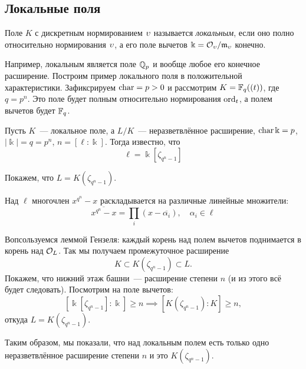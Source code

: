 	 \subsection{Локальные поля}

	 \begin{definition} 
	 	Поле $K$ с дискретным нормированием $\upsilon$ называется \emph{локальным}, если оно полно относительно нормирования $\upsilon$, а его поле вычетов $\Bbbk = \mathcal{O}_{\upsilon}/\mathfrak{m}_{\upsilon}$  конечно. 
	 \end{definition}

	 \begin{example}
	 	Например, локальным является поле $\mathbb{Q}_{p}$ и вообще любое его конечное расширение. Построим пример локального поля в положительной характеристики. Зафиксрируем $\operatorname{char} = p > 0$ и рассмотрим $K = \mathbb{F}_{q}((t))$, где $q = p^n$. Это поле будет полным относительно нормирования $\operatorname{ord}_{t}$, а полем вычетов будет $\mathbb{F}_{q}$.
	 \end{example}

	 Пусть $K$~--- локальное поле, а $L/K$~--- неразветвлённое расширение, $\operatorname{char}{\Bbbk} = p$, $|\Bbbk| = q = p^n$, $n = [\ell : \Bbbk]$. Тогда известно, что 
	 \[
	 	\ell = \Bbbk[\zeta_{q^n - 1}]
	 \]

	 Покажем, что $L = K(\zeta_{q^n - 1})$. 

	 Над $\ell$ многочлен $x^{q^n} - x$ раскладывается на различные линейные множители:
	 \[
	 	\overline{x^{q^n} - x} = \prod_{i}(x - \overline{\alpha_i}), \quad \alpha_i \in \ell 
	 \]

	 Вопсользуемся леммой Гензеля: каждый корень над полем вычетов поднимается в корень над $\mathcal{O}_{L}$. Так мы получаем промежуточное расширение 
	 \[
	 	K \subset K(\zeta_{q^n - 1}) \subset L.
	 \]
	 Покажем, что нижний этаж башни~--- расширение степени $n$ (и из этого всё будет следовать). Посмотрим на поле вычетов:
	 \[
	 	[\Bbbk[\zeta_{q^n - 1}] : \Bbbk] \ge n \implies [ K(\zeta_{q^n - 1}) : K ] \ge n,
	 \]
	 откуда $L = K(\zeta_{q^n - 1})$. 

	 Таким образом, мы показали, что над локальным полем есть только одно неразветвлённое расширение степени $n$ и это $K(\zeta_{q^n - 1})$.

